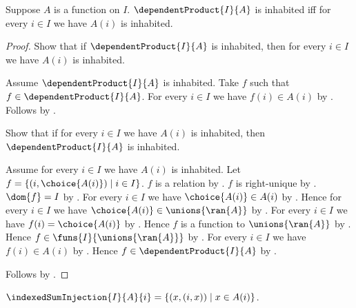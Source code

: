 \begin{theorem}\label{dependent_product_inhabited_iff}
    Suppose $A$ is a function on $I$.
    $\dependentProduct{I}{A}$ is inhabited iff
        for every $i\in I$ we have $A(i)$ is inhabited.
\end{theorem}
\begin{proof}
    Show that if $\dependentProduct{I}{A}$ is inhabited, then
        for every $i\in I$ we have $A(i)$ is inhabited.
    \begin{subproof}
        Assume $\dependentProduct{I}{A}$ is inhabited.
        Take $f$ such that $f\in\dependentProduct{I}{A}$.
        For every $i\in I$ we have $f(i)\in A(i)$
            by .
        Follows by \auto.
    \end{subproof}
    Show that if for every $i\in I$ we have $A(i)$ is inhabited, then
        $\dependentProduct{I}{A}$ is inhabited.
    \begin{subproof}
        Assume for every $i\in I$ we have $A(i)$ is inhabited.
        Let $f=\{(i,\choice{A(i)})\mid i\in I\}$.
        $f$ is a relation by .
        $f$ is right-unique by .
        $\dom{f}=I$ by .
        For every $i\in I$ we have $\choice{A(i)}\in A(i)$
            by .
        Hence for every $i\in I$ we have
            $\choice{A(i)}\in\unions{\ran{A}}$
            by .
        For every $i\in I$ we have $f(i)=\choice{A(i)}$
            by .
        Hence $f$ is a function to $\unions{\ran{A}}$ by \auto.
        Hence $f\in\funs{I}{\unions{\ran{A}}}$
            by .
        For every $i\in I$ we have $f(i)\in A(i)$ by \auto.
        Hence $f\in\dependentProduct{I}{A}$
            by .
    \end{subproof}
    Follows by \auto.
\end{proof}

\begin{definition}\label{indexed_sum_injection}
    $\indexedSumInjection{I}{A}{i}
        =\{(x,(i,x))\mid x\in A(i)\}$.
\end{definition}

